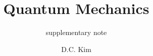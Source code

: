 \documentclass[graybox,envcountchap,sectrefs]{style/svmono}
\begin{document}
\author{D.C. Kim}
\title{Quantum Mechanics}
\subtitle{supplementary note}
\maketitle

\frontmatter%

%
%
%
%

\tableofcontents




\mainmatter%
%




%


\backmatter%


\printindex

\end{document}
